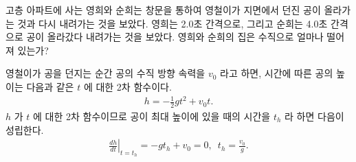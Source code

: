 \documentclass[floatfix,nofootinbib,superscriptaddress,fleqn,preprint]{revtex4}
\begin{document}




 고층 아파트에 사는 영희와 순희는 창문을 통하여 
영철이가 지면에서 던진 공이 올라가는 것과 다시 내려가는 것을 보았다. 
영희는 2.0초 간격으로, 그리고 순희는 4.0초 간격으로 공이 올라갔다 
내려가는 것을 보았다. 영희와 순희의 집은 수직으로 얼마나 떨어져 있는가?

\vspace{1cm}

영철이가 공을 던지는 순간 공의 수직 방향 속력을 $v_0$ 라고 하면, 
시간에 따른 공의 높이는 다음과 같은 $t$ 에 대한 2차 함수이다.
\begin{align}
  h = -\frac{1}{2}gt^2+v_0t.
\end{align} $h$ 가 $t$ 에 대한 2차 함수이므로
 공이 최대 높이에 있을 때의 시간을 $t_h$ 라 하면 다음이 성립한다.
\begin{align}\label{eq:4.1}
  \left.\frac{dh}{dt}\right|_{t=t_h} 
  = -gt_h+v_0=0,\,\,\,t_h=\frac{v_0}{g}.
\end{align}
\end{document}
